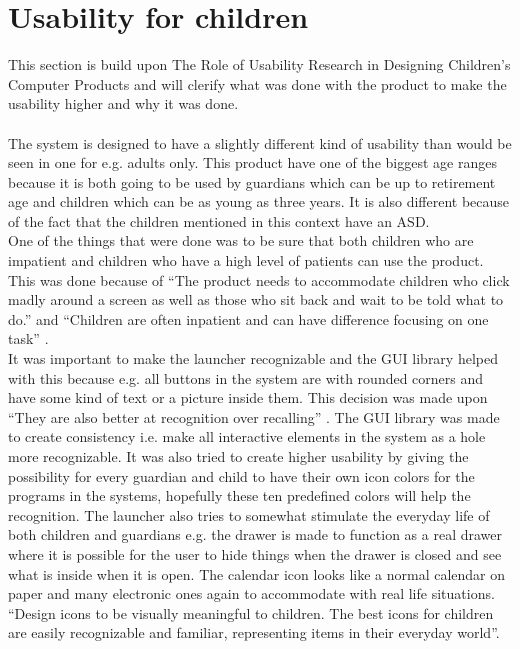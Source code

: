 \section{Usability for children}
\label{Preanalysis:Usability_for_children}
This section is build upon The Role of Usability Research in Designing Children's Computer Products and will clerify what was done with the product to make the usability higher and why it was done.\\\\
The \giraf[] system is designed to have a slightly different kind of usability than would be seen in one for e.g. adults only. This product have one of the biggest age ranges because it is both going to be used by guardians which can be up to retirement age and children which can be as young as three years. It is also different because of the fact that the children mentioned in this context have an ASD.\\
One of the things that were done was to be sure that both children who are impatient and children who have a high level of patients can use the product. This was done because of ``The product needs to accommodate children who click madly around a screen as well as those who sit back and wait to be told what to do.'' \citep{microsoft:usability} and ``Children are often inpatient and can have difference focusing on one task'' \citep{microsoft:usability}.\\
It was important to make the launcher recognizable and the \giraf[] GUI library helped with this because e.g. all buttons in the \giraf[] system are with rounded corners and have some kind of text or a picture inside them. This decision was made upon ``They are also better at recognition over recalling'' \citep{microsoft:usability}. The \giraf[] GUI library was made to create consistency i.e. make all interactive elements in the \giraf[] system as a hole more recognizable. It was also tried to create higher usability by giving the possibility for every guardian and child to have their own icon colors for the programs in the \giraf[] systems, hopefully these ten predefined colors will help the recognition. The launcher also tries to somewhat stimulate the everyday life of both children and guardians e.g. the drawer is made to function as a real drawer where it is possible for the user to hide things when the drawer is closed and see what is inside when it is open. The calendar icon looks like a normal calendar on paper and many electronic ones again to accommodate with real life situations. 
``Design icons to be visually meaningful to children. The best icons for children are easily recognizable and familiar, representing items in their everyday world''\citep{microsoft:usability}.  \\
